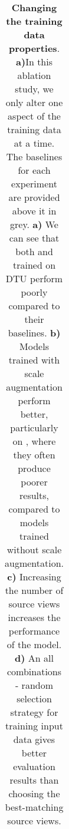 \begin{table}[ht!]
\begin{adjustbox}{width=1\textwidth}
\begin{tabular}{|l
|c c
|c c
|c c
|c c
|c c
||c |c |c |c |c
|}
    \hline

\end{tabular}
\end{adjustbox}
\caption[Changing the training data properties]{\textbf{Changing the training data properties}.
\textbf{a)}In this ablation study, we only alter one aspect of the training data at a time. The baselines for each experiment are provided above it in grey. \textbf{a)} We can see that both {\mvsn} and {\rmvd} trained on DTU perform poorly compared to their baselines. \textbf{b)} Models trained with scale augmentation perform better, particularly on {\ethd}, where they often produce poorer results, compared to models trained without scale augmentation. \textbf{c)} Increasing the number of source views increases the performance of the model. \textbf{d)} An all combinations - random selection strategy for training input data gives better evaluation results than choosing the best-matching source views. 
\label{tab:data-prop}
}
\end{table}

